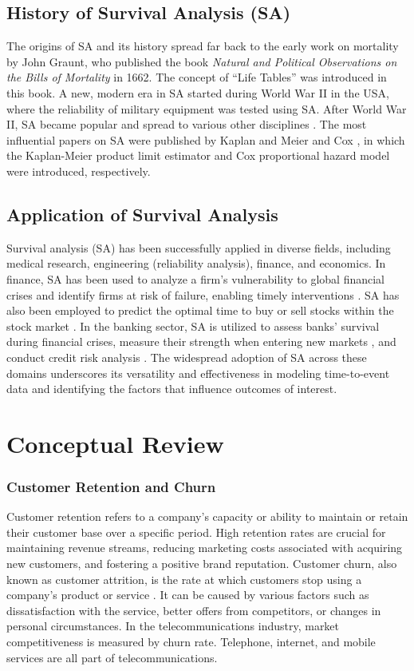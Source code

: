 \documentclass[doublespacing]{report} [12px]%
\begin{document}
\subsection{History of Survival Analysis (SA)}
The origins of SA and its history spread far back to the early work on mortality by John Graunt, who published the book \textit{Natural and Political Observations on the Bills of Mortality} in 1662. The concept of “Life Tables” was introduced in this book. A new, modern era in SA started during World War II in the USA, where the reliability of military equipment was tested using SA. After World War II, SA became popular and spread to various other disciplines \cite{Jerenz2008}. The most influential papers on SA were published by Kaplan and Meier \cite{Kaplan1958} and Cox \cite{Cox1972}, in which the Kaplan-Meier product limit estimator and Cox proportional hazard model were introduced, respectively.

\subsection{Application of Survival Analysis}
Survival analysis (SA) has been successfully applied in diverse fields, including medical research, engineering (reliability analysis), finance, and economics. In finance, SA has been used to analyze a firm's vulnerability to global financial crises and identify firms at risk of failure, enabling timely interventions \cite{Lee2014, Pereira2014, Kumar2015, Iwasaki2014}. SA has also been employed to predict the optimal time to buy or sell stocks within the stock market \cite{Kumar2015}. In the banking sector, SA is utilized to assess banks' survival during financial crises, measure their strength when entering new markets \cite{Leung2010, Evrensel2008}, and conduct credit risk analysis \cite{Tsujitani2012, Baesens2005}. The widespread adoption of SA across these domains underscores its versatility and effectiveness in modeling time-to-event data and identifying the factors that influence outcomes of interest.

\section{Conceptual Review}

\subsubsection{Customer Retention and Churn}
Customer retention refers to a company's capacity or ability to maintain or retain their customer base over a specific period. High retention rates are crucial for maintaining revenue streams, reducing marketing costs associated with acquiring new customers, and fostering a positive brand reputation. Customer churn, also known as customer attrition, is the rate at which customers stop using a company's product or service \cite{Masarifoglu2019} . It can be caused by various factors such as dissatisfaction with the service, better offers from competitors, or changes in personal circumstances. In the telecommunications industry, market competitiveness is measured by churn rate. Telephone, internet, and mobile services are all part of telecommunications.
\end{document}
